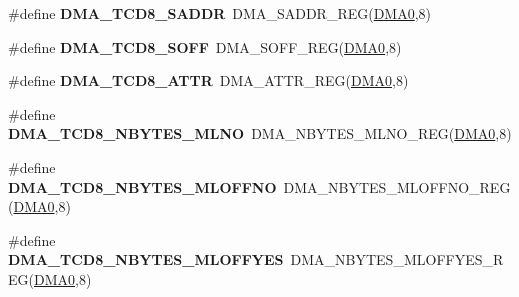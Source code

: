 \begin{DoxyCompactItemize}
\item 
\#define {\bfseries D\+M\+A\+\_\+\+T\+C\+D8\+\_\+\+S\+A\+D\+DR}~D\+M\+A\+\_\+\+S\+A\+D\+D\+R\+\_\+\+R\+EG(\hyperlink{group__DMA__Peripheral__Access__Layer_ga4103044f9ca209772f513dc694513ffb}{D\+M\+A0},8)\hypertarget{group__DMA__Register__Accessor__Macros_ga20929e81a1414d68284332fe54c3394e}{}\label{group__DMA__Register__Accessor__Macros_ga20929e81a1414d68284332fe54c3394e}

\item 
\#define {\bfseries D\+M\+A\+\_\+\+T\+C\+D8\+\_\+\+S\+O\+FF}~D\+M\+A\+\_\+\+S\+O\+F\+F\+\_\+\+R\+EG(\hyperlink{group__DMA__Peripheral__Access__Layer_ga4103044f9ca209772f513dc694513ffb}{D\+M\+A0},8)\hypertarget{group__DMA__Register__Accessor__Macros_gab1105a5f653de713708697e108fa31fd}{}\label{group__DMA__Register__Accessor__Macros_gab1105a5f653de713708697e108fa31fd}

\item 
\#define {\bfseries D\+M\+A\+\_\+\+T\+C\+D8\+\_\+\+A\+T\+TR}~D\+M\+A\+\_\+\+A\+T\+T\+R\+\_\+\+R\+EG(\hyperlink{group__DMA__Peripheral__Access__Layer_ga4103044f9ca209772f513dc694513ffb}{D\+M\+A0},8)\hypertarget{group__DMA__Register__Accessor__Macros_ga13699886fa956fad85a58d6e9caa8692}{}\label{group__DMA__Register__Accessor__Macros_ga13699886fa956fad85a58d6e9caa8692}

\item 
\#define {\bfseries D\+M\+A\+\_\+\+T\+C\+D8\+\_\+\+N\+B\+Y\+T\+E\+S\+\_\+\+M\+L\+NO}~D\+M\+A\+\_\+\+N\+B\+Y\+T\+E\+S\+\_\+\+M\+L\+N\+O\+\_\+\+R\+EG(\hyperlink{group__DMA__Peripheral__Access__Layer_ga4103044f9ca209772f513dc694513ffb}{D\+M\+A0},8)\hypertarget{group__DMA__Register__Accessor__Macros_gaf790a6c71e0fbfc98f7c7edea11862e7}{}\label{group__DMA__Register__Accessor__Macros_gaf790a6c71e0fbfc98f7c7edea11862e7}

\item 
\#define {\bfseries D\+M\+A\+\_\+\+T\+C\+D8\+\_\+\+N\+B\+Y\+T\+E\+S\+\_\+\+M\+L\+O\+F\+F\+NO}~D\+M\+A\+\_\+\+N\+B\+Y\+T\+E\+S\+\_\+\+M\+L\+O\+F\+F\+N\+O\+\_\+\+R\+EG(\hyperlink{group__DMA__Peripheral__Access__Layer_ga4103044f9ca209772f513dc694513ffb}{D\+M\+A0},8)\hypertarget{group__DMA__Register__Accessor__Macros_gae2ff09bfa732b7e37ba88433b2a69e39}{}\label{group__DMA__Register__Accessor__Macros_gae2ff09bfa732b7e37ba88433b2a69e39}

\item 
\#define {\bfseries D\+M\+A\+\_\+\+T\+C\+D8\+\_\+\+N\+B\+Y\+T\+E\+S\+\_\+\+M\+L\+O\+F\+F\+Y\+ES}~D\+M\+A\+\_\+\+N\+B\+Y\+T\+E\+S\+\_\+\+M\+L\+O\+F\+F\+Y\+E\+S\+\_\+\+R\+EG(\hyperlink{group__DMA__Peripheral__Access__Layer_ga4103044f9ca209772f513dc694513ffb}{D\+M\+A0},8)\hypertarget{group__DMA__Register__Accessor__Macros_ga16dfd53221d052e7931b716d37783ecc}{}\label{group__DMA__Register__Accessor__Macros_ga16dfd53221d052e7931b716d37783ecc}


\end{DoxyCompactItemize}
